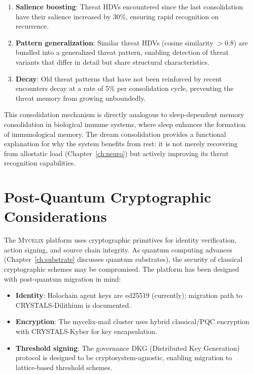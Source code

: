 \documentclass[12pt]{book}
\newcommand{\mycelix}{\textsc{Mycelix}}
\begin{document}
\begin{enumerate}
  \item \textbf{Salience boosting}: Threat HDVs encountered since the last consolidation have their salience increased by 30\%, ensuring rapid recognition on recurrence.
  \item \textbf{Pattern generalization}: Similar threat HDVs (cosine similarity $> 0.8$) are bundled into a generalized threat pattern, enabling detection of threat variants that differ in detail but share structural characteristics.
  \item \textbf{Decay}: Old threat patterns that have not been reinforced by recent encounters decay at a rate of 5\% per consolidation cycle, preventing the threat memory from growing unboundedly.
\end{enumerate}

This consolidation mechanism is directly analogous to sleep-dependent memory consolidation in biological immune systems, where sleep enhances the formation of immunological memory. The dream consolidation provides a functional explanation for why the system benefits from rest: it is not merely recovering from allostatic load (Chapter~\ref{ch:neuro}) but actively improving its threat recognition capabilities.

\section{Post-Quantum Cryptographic Considerations}

The \mycelix{} platform uses cryptographic primitives for identity verification, action signing, and source chain integrity. As quantum computing advances (Chapter~\ref{ch:substrate} discusses quantum substrates), the security of classical cryptographic schemes may be compromised. The platform has been designed with post-quantum migration in mind:

\begin{itemize}
  \item \textbf{Identity}: Holochain agent keys are ed25519 (currently); migration path to CRYSTALS-Dilithium is documented.
  \item \textbf{Encryption}: The mycelix-mail cluster uses hybrid classical/PQC encryption with CRYSTALS-Kyber for key encapsulation.
  \item \textbf{Threshold signing}: The governance DKG (Distributed Key Generation) protocol is designed to be cryptosystem-agnostic, enabling migration to lattice-based threshold schemes.
\end{itemize}
\end{document}
